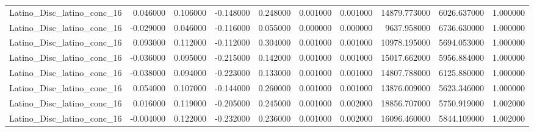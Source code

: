 \begin{table}
\begin{tabular}{lrrrrrrrrr}
Latino_Disc_latino_conc_16 & 0.046000 & 0.106000 & -0.148000 & 0.248000 & 0.001000 & 0.001000 & 14879.773000 & 6026.637000 & 1.000000 \\
Latino_Disc_latino_conc_16 & -0.029000 & 0.046000 & -0.116000 & 0.055000 & 0.000000 & 0.000000 & 9637.958000 & 6736.630000 & 1.000000 \\
Latino_Disc_latino_conc_16 & 0.093000 & 0.112000 & -0.112000 & 0.304000 & 0.001000 & 0.001000 & 10978.195000 & 5694.053000 & 1.000000 \\
Latino_Disc_latino_conc_16 & -0.036000 & 0.095000 & -0.215000 & 0.142000 & 0.001000 & 0.001000 & 15017.662000 & 5956.884000 & 1.000000 \\
Latino_Disc_latino_conc_16 & -0.038000 & 0.094000 & -0.223000 & 0.133000 & 0.001000 & 0.001000 & 14807.788000 & 6125.880000 & 1.000000 \\
Latino_Disc_latino_conc_16 & 0.054000 & 0.107000 & -0.144000 & 0.260000 & 0.001000 & 0.001000 & 13876.009000 & 5623.346000 & 1.000000 \\
Latino_Disc_latino_conc_16 & 0.016000 & 0.119000 & -0.205000 & 0.245000 & 0.001000 & 0.002000 & 18856.707000 & 5750.919000 & 1.002000 \\
Latino_Disc_latino_conc_16 & -0.004000 & 0.122000 & -0.232000 & 0.236000 & 0.001000 & 0.002000 & 16096.460000 & 5844.109000 & 1.002000 \\
\bottomrule
\end{tabular}
\end{table}
